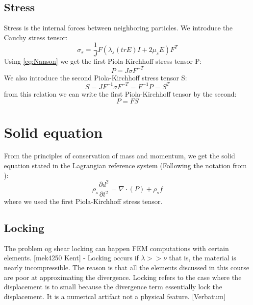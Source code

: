\subsection{Stress}
Stress is the internal forces between neighboring particles. We introduce the Cauchy stress tensor:
\begin{equation}
 \sigma_s = \frac{1}{J} F(\lambda_s (tr E)I + 2\mu_sE) F^T
\end{equation}
Using \eqref{eq:Nanson} we get the first Piola-Kirchhoff stress tensor P:
\begin{equation}
 P = J \sigma F^{-T} 
\end{equation}
We also introduce the second Piola-Kirchhoff stress tensor S:
\begin{equation}
S = J F^{-1}\sigma F^{-T} = F^{-1} P = S^T 
\end{equation}
from this relation we can write the first Piola-Kirchhoff tensor by the second:
\begin{equation}
P = FS
\end{equation}

\section{Solid equation}
From the principles of conservation of mass and momentum, we get the solid equation stated in the Lagrangian reference system (Following the notation from \cite{Richter2016}):
\begin{equation}\label{eq:Solid}
\rho_s \frac{\partial d^2}{\partial t^2} = \nabla \cdot ( P ) + \rho_s f 
\end{equation}
where we used the first Piola-Kirchhoff stress tensor.

\subsection*{Locking}
The problem og shear locking can happen FEM computations with certain elements. 
[mek4250 Kent] - Locking occurs if  $ \lambda >> \nu $ that is, the material is nearly incompressible. The reason is that all the elements discussed in this course are poor at approximating the divergence. Locking refers to the case where the displacement is to small because the divergence term essentially lock the displacement. It is a numerical artifact not a physical feature. [Verbatum]






